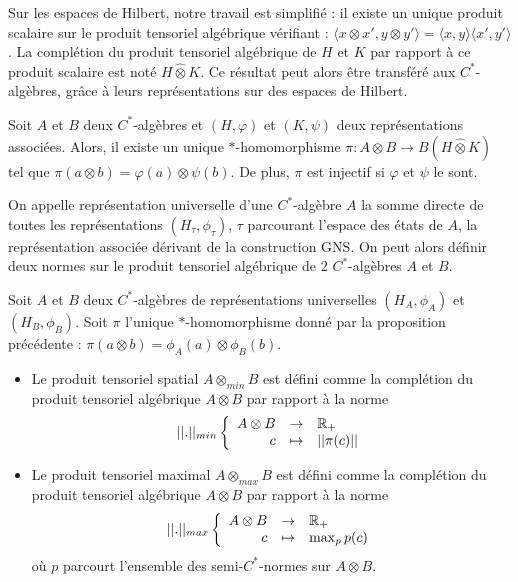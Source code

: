 Sur les espaces de Hilbert, notre travail est simplifié : il existe un unique produit scalaire sur le produit tensoriel algébrique vérifiant : $\langle x\otimes x', y\otimes y'\rangle=\langle x, y\rangle \langle x',y' \rangle$. La complétion du produit tensoriel algébrique de $H$ et $K$ par rapport à ce produit scalaire est noté $H\hat \otimes K$. Ce résultat peut alors être transféré aux $C^*$-algèbres, grâce à leurs représentations sur des espaces de Hilbert. 

\begin{prop}
Soit $A$ et $B$ deux $C^*$-algèbres et $(H,\varphi)$ et $(K,\psi)$ deux représentations associées. Alors, il existe un unique $*$-homomorphisme $\pi : A\otimes B \rightarrow B(H\hat\otimes K)$ tel que $\pi(a\otimes b)= \varphi(a)\otimes \psi(b)$. De plus, $\pi$ est injectif si $\varphi$ et $\psi$ le sont.
\end{prop} 

On appelle représentation universelle d'une $C^*$-algèbre $A$ la somme directe de toutes les représentations $(H_\tau,\phi_\tau)$, $\tau$ parcourant l'espace des états de $A$, la représentation associée dérivant de la construction GNS. On peut alors définir deux normes sur le produit tensoriel algébrique de $2$ $C^*$-algèbres $A$ et $B$.

\begin{definition}
Soit $A$ et $B$ deux $C^*$-algèbres de représentations universelles $(H_A, \phi_A)$ et $(H_B, \phi_B)$. Soit $\pi$ l'unique $*$-homomorphisme donné par la proposition précédente : $\pi(a\otimes b ) = \phi_A(a)\otimes \phi_B(b)$.
\begin{itemize}
\item Le produit tensoriel spatial $A\otimes_{min} B$ est défini comme la complétion du produit tensoriel algébrique $A\otimes B$ par rapport à la norme 
\[||.||_{min}\left\{\begin{array}{rcl} A\otimes B & \rightarrow & \mathbb R_+ \\ c & \mapsto & ||\pi(c)||\end{array}\right.\]
\item Le produit tensoriel maximal $A\otimes_{max} B$ est défini comme la complétion du produit tensoriel algébrique $A\otimes B$ par rapport à la norme 
\[||.||_{max}\left\{\begin{array}{rcl} A\otimes B & \rightarrow & \mathbb R_+ \\ c & \mapsto & \max_{p} p(c)\end{array}\right.\]
où $p$ parcourt l'ensemble des semi-$C^*$-normes sur $A\otimes B$.
\end{itemize}
\end{definition}

